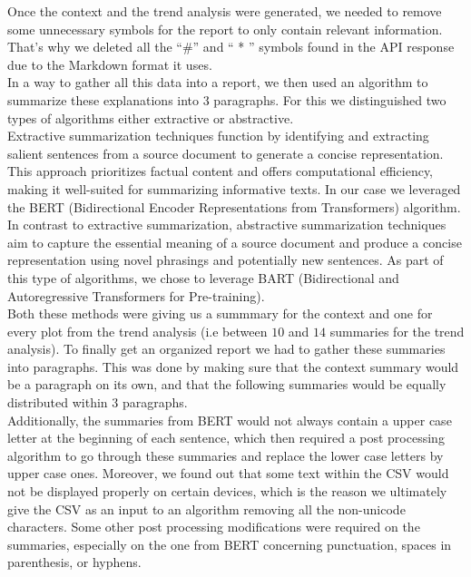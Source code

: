 \documentclass[preprint,12pt]{elsarticle}
\begin{document}
Once the context and the trend analysis were generated, we needed to remove some unnecessary symbols for the report to only contain relevant information. That’s why we deleted all the “\#” and “ * ” symbols found in the API response due to the Markdown format it uses.\\

In a way to gather all this data into a report, we then used an algorithm to summarize these explanations into $3$ paragraphs. For this we distinguished two types of algorithms either extractive or abstractive. \\

Extractive summarization techniques function by identifying and extracting salient sentences from a source document to generate a concise representation. This approach prioritizes factual content and offers computational efficiency, making it well-suited for summarizing informative texts. In our case we leveraged the BERT (Bidirectional Encoder Representations from Transformers) algorithm.  \\

In contrast to extractive summarization, abstractive summarization techniques aim to capture the essential meaning of a source document and produce a concise representation using novel phrasings and potentially new sentences. As part of this type of algorithms, we chose to leverage BART (Bidirectional and Autoregressive Transformers for Pre-training). \\

Both these methods were giving us a summmary for the context and one for every plot from the trend analysis (i.e between $10$ and $14$ summaries for the trend analysis). To finally get an organized report we had to gather these summaries into paragraphs. This was done by making sure that the context summary would be a paragraph on its own, and that the following summaries would be equally distributed within $3$ paragraphs.\\

Additionally, the summaries from BERT would not always contain a upper case letter at the beginning of each sentence, which then required a post processing algorithm to go through these summaries and replace the lower case letters by upper case ones. Moreover, we found out that some text within the CSV would not be displayed properly on certain devices, which is the reason we ultimately give the CSV as an input to an algorithm removing all the non-unicode characters. Some other post processing modifications were required on the summaries, especially on the one from BERT concerning punctuation, spaces in parenthesis, or hyphens. \\
\end{document}
